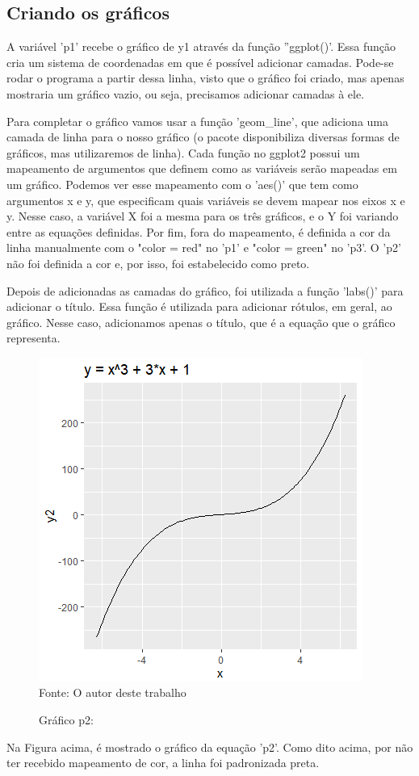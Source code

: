     \subsection{Criando os gráficos}
    A variável 'p1' recebe o gráfico de y1 através da função ''ggplot()'. Essa função cria um sistema de coordenadas em que é possível adicionar camadas. Pode-se rodar o programa a partir dessa linha, visto que o gráfico foi criado, mas apenas mostraria um gráfico vazio, ou seja, precisamos adicionar camadas à ele.\par Para completar o gráfico vamos usar a função 'geom\_line', que adiciona uma camada de linha para o nosso gráfico (o pacote disponibiliza diversas formas de gráficos, mas utilizaremos de linha). Cada função no ggplot2 possui um mapeamento de argumentos que definem como as variáveis serão mapeadas em um gráfico. Podemos ver esse mapeamento com o 'aes()' que tem como argumentos x e y, que especificam quais variáveis se devem mapear nos eixos x e y. Nesse caso, a variável X foi a mesma para os três gráficos, e o Y foi variando entre as equações definidas. Por fim, fora do mapeamento, é definida a cor da linha manualmente com o "color = red" no 'p1' e "color = green" no 'p3'. O 'p2' não foi definida a cor e, por isso, foi estabelecido como preto.\par Depois de adicionadas as camadas do gráfico, foi utilizada a função 'labs()' para adicionar o título. Essa função é utilizada para adicionar rótulos, em geral, ao gráfico. Nesse caso, adicionamos apenas o título, que é a equação que o gráfico representa.
    \begin{figure}[H]
    	\centering
    	\caption{Gráfico p2:}
    	\includegraphics[width=1.0\linewidth]{Prints/screenshot021}
    	\label{fig:screenshot021}
    	{\tiny \sf Fonte: O autor deste trabalho }
    \end{figure}
    Na Figura acima, é mostrado o gráfico da equação 'p2'. Como dito acima, por não ter recebido mapeamento de cor, a linha foi padronizada preta.
